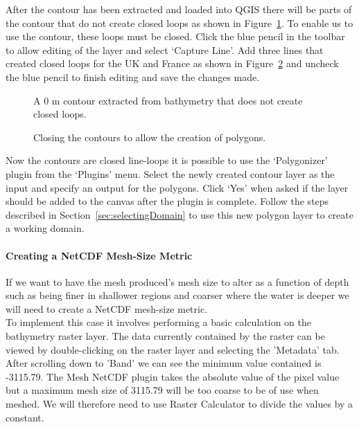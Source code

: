 After the contour has been extracted and loaded into QGIS there will be parts of the contour that do not create closed loops as shown in Figure~\ref{fig:mn_openContour}. To enable us to use the contour, these loops must be closed. Click the blue pencil in the toolbar to allow editing of the layer and select `Capture Line'. Add three lines that created closed loops for the UK and France as shown in Figure~\ref{fig:mn_closedContour} and uncheck the blue pencil to finish editing and save the changes made. \\

\begin{figure}[h!]
  \centering
  \caption{A 0 m contour extracted from bathymetry that does not create closed loops.}
  \label{fig:mn_openContour}
\end{figure}

\begin{figure}[h!]
  \centering
  \caption{Closing the contours to allow the creation of polygons.}
  \label{fig:mn_closedContour}
\end{figure}

Now the contours are closed line-loops it is possible to use the `Polygonizer' plugin from the `Plugins' menu. Select the newly created contour layer as the input and specify an output for the polygons. Click `Yes' when asked if the layer should be added to the canvas after the plugin is complete. Follow the steps described in Section~\ref{sec:selectingDomain} to use this new polygon layer to create a working domain.

\paragraph{Creating a NetCDF Mesh-Size Metric\\}
\label{sec:createMetric}
If we want to have the mesh produced's mesh size to alter as a function of depth such as being finer in shallower regions and coarser where the water is deeper we will need to create a NetCDF mesh-size metric. \\

To implement this case it involves performing a basic calculation on the bathymetry raster layer. The data currently contained by the raster can be viewed by double-clicking on the raster layer and selecting the 'Metadata' tab. After scrolling down to 'Band' we can see the minimum value contained is -3115.79. The Mesh NetCDF plugin takes the absolute value of the pixel value but a maximum mesh size of 3115.79 will be too coarse to be of use when meshed. We will therefore need to use Raster Calculator to divide the values by a constant.


